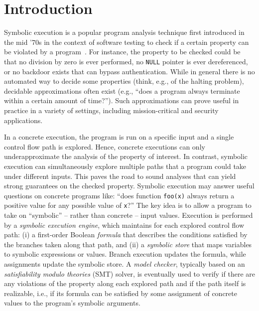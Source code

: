 
\section{Introduction}
\label{se:intro}

Symbolic execution is a popular program analysis technique first introduced in the mid '70s in the context of software testing to check if a certain property can be violated by a program~\cite{K-ICRS75,SELECT-ICRS75,K-CACM76,H-TSE77}. For instance, the property to be checked could be that no division by zero is ever performed, no {\tt NULL} pointer is ever dereferenced, or no backdoor exists that can bypass authentication. While in general there is no automated way to decide some properties (think, e.g., of the halting problem),  decidable approximations often exist (e.g., ``does a program always terminate within a certain amount of time?''). Such approximations can prove useful in practice in a variety of settings, including mission-critical and security applications.

In a concrete execution, the program is run on a specific input and a single control flow path is explored. Hence, concrete executions can only underapproximate the analysis of the property of interest. In contrast, symbolic execution can simultaneously explore multiple paths that a program could take under different inputs. This paves the road to sound analyses that can yield strong guarantees on the checked property. Symbolic execution may answer useful questions on concrete programs like: ``does function {\tt foo(x)} always return a positive value for any possible value of {\tt x}?'' The key idea is to allow a program to take on ``symbolic'' -- rather than concrete -- input values. Execution is performed by a {\em symbolic execution engine}, which maintains for each explored control flow path: (i) a first-order Boolean {\em formula} that describes the conditions satisfied by the branches taken along that path, and (ii) a {\em symbolic store} that maps variables to symbolic expressions or values. Branch execution updates the formula, while assignments update the symbolic store. A {\em model checker}, typically based on an {\em satisfiability modulo theories} (SMT) solver\cite{HandbookOfSAT2009}, is eventually used to verify if there are any violations of the property along each explored path and if the path itself is realizable, i.e., if its formula can be satisfied by some assignment of concrete values to the program's symbolic arguments.

